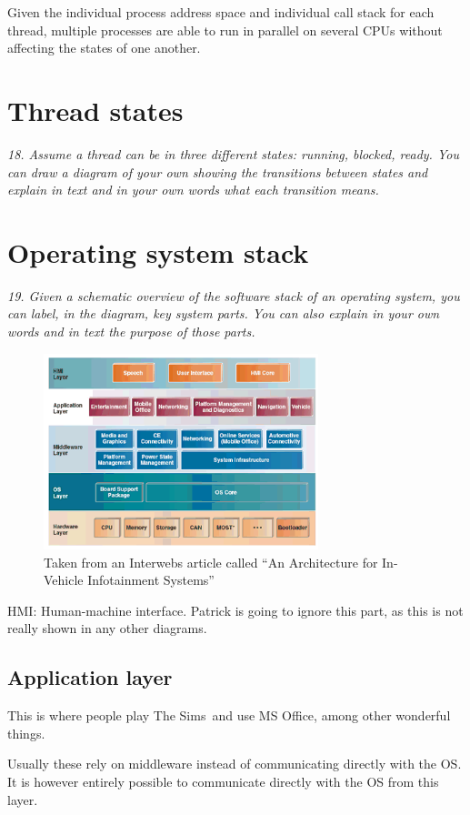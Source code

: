 \documentclass{article}
\begin{document}
Given the individual process address space and individual call stack for each thread, multiple processes are able to run in parallel on several CPUs without affecting the states of one another.


\section{Thread states}
\emph{18. Assume a thread can be in three different states: running, blocked, ready. You can draw a diagram of your own showing the transitions between states and explain in text and in your own words what each transition means.}



\section{Operating system stack}
\emph{19. Given a schematic overview of the software stack of an operating system, you can label, in the diagram, key system parts. You can also explain in your own words and in text the purpose of those parts.}


\begin{figure}[H]
  \centering
  \includegraphics[width=8.0cm]{images/os-stack.png}
  \caption{Taken from an Interwebs article called ``An Architecture for In-Vehicle Infotainment Systems''}
\end{figure}

HMI: Human-machine interface. Patrick is going to ignore this part, as this is not really shown in any other diagrams.

\subsection*{Application layer}
This is where people play The Sims\texttrademark\ and use MS Office, among other wonderful things.

Usually these rely on middleware instead of communicating directly with the OS. It is however entirely possible to communicate directly with the OS from this layer.
\end{document}
